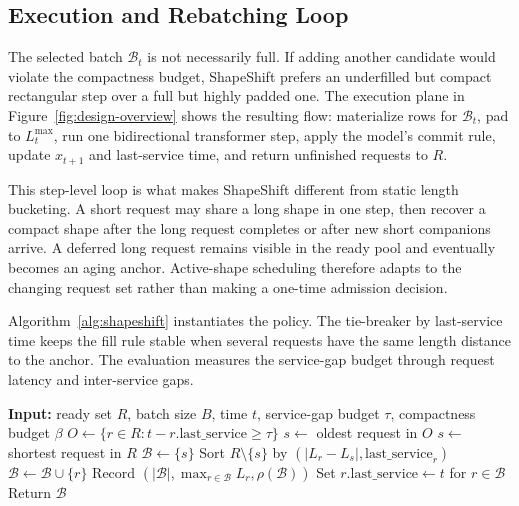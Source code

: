 \documentclass[letterpaper]{article} \usepackage[submission]{aaai2027} \usepackage[hyphens]{url} \usepackage{graphicx} \usepackage{subcaption} \urlstyle{rm} \def\UrlFont{\rm} \usepackage{natbib} \usepackage{amsmath} \usepackage{amssymb} \usepackage{booktabs} \usepackage{multirow} \usepackage{algorithm} \usepackage{algorithmic}
\begin{document}
\subsection{Execution and Rebatching Loop}

The selected batch $\mathcal{B}_t$ is not necessarily full. If adding another candidate would violate the compactness budget, ShapeShift prefers an underfilled but compact rectangular step over a full but highly padded one. The execution plane in Figure~\ref{fig:design-overview} shows the resulting flow: materialize rows for $\mathcal{B}_t$, pad to $L_t^{\max}$, run one bidirectional transformer step, apply the model's commit rule, update $x_{t+1}$ and last-service time, and return unfinished requests to $R$.

This step-level loop is what makes ShapeShift different from static length bucketing. A short request may share a long shape in one step, then recover a compact shape after the long request completes or after new short companions arrive. A deferred long request remains visible in the ready pool and eventually becomes an aging anchor. Active-shape scheduling therefore adapts to the changing request set rather than making a one-time admission decision.

Algorithm~\ref{alg:shapeshift} instantiates the policy. The tie-breaker by last-service time keeps the fill rule stable when several requests have the same length distance to the anchor. The evaluation measures the service-gap budget through request latency and inter-service gaps.

\begin{algorithm}[t]
\caption{ShapeShift Active-Shape Step Scheduler}
\label{alg:shapeshift}
\begin{algorithmic}[1]
\STATE \textbf{Input:} ready set $R$, batch size $B$, time $t$, service-gap budget $\tau$, compactness budget $\beta$
\STATE $O \leftarrow \{r\in R: t-r.\mathrm{last\_service}\ge \tau\}$
  \STATE $s \leftarrow$ oldest request in $O$
\ELSE
  \STATE $s \leftarrow$ shortest request in $R$
\ENDIF
\STATE $\mathcal{B}\leftarrow \{s\}$
\STATE Sort $R\setminus\{s\}$ by $(|L_r-L_s|, \mathrm{last\_service}_r)$
    \STATE $\mathcal{B}\leftarrow\mathcal{B}\cup\{r\}$
  \ENDIF
\ENDFOR
\STATE Record $(|\mathcal{B}|,\max_{r\in\mathcal{B}}L_r,\rho(\mathcal{B}))$
\STATE Set $r.\mathrm{last\_service}\leftarrow t$ for $r\in\mathcal{B}$
\STATE Return $\mathcal{B}$
\end{algorithmic}
\end{algorithm}
\end{document}
